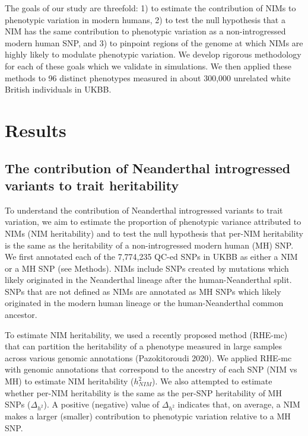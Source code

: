The goals of our study are threefold: 1) to estimate the contribution of NIMs to phenotypic variation in modern humans, 2) to test the null hypothesis that a NIM has the same contribution to phenotypic variation as a non-introgressed modern human SNP, and 3) to pinpoint regions of the genome at which NIMs are highly likely to modulate phenotypic variation. We develop rigorous methodology for each of these goals which we validate in simulations. We then applied these methods to 96 distinct phenotypes measured in about 300,000 unrelated white British individuals in UKBB.
\section{Results}
\subsection{The contribution of Neanderthal introgressed variants to trait heritability}
To understand the contribution of Neanderthal introgressed variants to trait variation, we aim to estimate the proportion of phenotypic variance attributed to NIMs (NIM heritability) and to test the null hypothesis that per-NIM heritability is the same as the heritability of a non-introgressed modern human (MH) SNP. We first annotated each of the 7,774,235 QC-ed SNPs in UKBB as either a NIM or a MH SNP (see Methods). NIMs include SNPs created by mutations which likely originated in the Neanderthal lineage after the human-Neanderthal split. SNPs that are not defined as NIMs are annotated as MH SNPs which likely originated in the modern human lineage or the human-Neanderthal common ancestor. 

To estimate NIM heritability, we used a recently proposed method (RHE-mc) that can partition the heritability of a phenotype measured in large samples across various genomic annotations (Pazokitoroudi 2020). We applied RHE-mc with genomic annotations that correspond to the ancestry of each SNP (NIM vs MH) to estimate NIM heritability ($h^2_{NIM}$). We also attempted to estimate whether per-NIM heritability is the same as the per-SNP heritability of MH SNPs ($\Delta_{h^2}$). A positive (negative) value of $\Delta_{h^2}$ indicates that, on average, a NIM makes a larger (smaller) contribution to phenotypic variation relative to a MH SNP.


